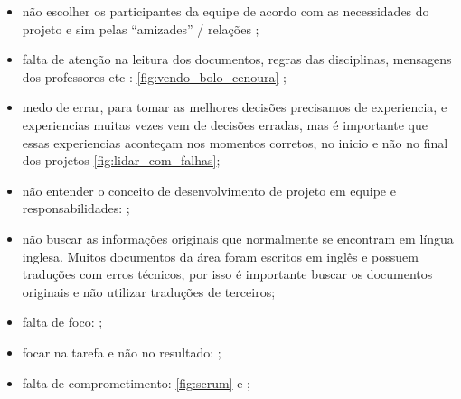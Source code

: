 \begin{itemize}
    \item não escolher os participantes da equipe de acordo com as necessidades do projeto e sim pelas \enquote{amizades} / relações \cite{jackson2019human} \cite{rene_leia_the_human_network} \cite{rene_como_emperrar_a_inovacao};

    \item falta de atenção na leitura dos documentos, regras das disciplinas, mensagens dos professores etc : \autoref{fig:vendo_bolo_cenoura} \cite{atencao_leitura_vendo_bolo_cenoura};
    
    \item medo de errar, para tomar as melhores decisões precisamos de experiencia, e experiencias muitas vezes vem de decisões erradas, mas é importante que essas experiencias aconteçam nos momentos corretos, no inicio e não no final dos projetos \cite{decisions_experience-1} \cite{decisions_experience-2} \autoref{fig:lidar_com_falhas};

    \item não entender o conceito de desenvolvimento de projeto em equipe e responsabilidades: 
    ;
    
    \item não buscar as informações originais que normalmente se encontram em língua inglesa. Muitos documentos da área foram escritos em inglês e possuem traduções com erros técnicos, por isso é importante buscar os documentos originais e não utilizar traduções de terceiros;
    
    \item falta de foco: 
    ;
    
    \item focar na tarefa e não no resultado:
    ;
    
    \item falta de comprometimento: 
    \autoref{fig:scrum} e 
    ;


\end{itemize}
